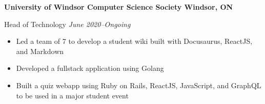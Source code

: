 \textbf{University of Windsor Computer Science Society \hfill Windsor, ON}

Head of Technology \hfill \textit{June 2020--Ongoing}
\begin{itemize}
    \item Led a team of 7 to develop a student wiki built with Docusaurus, ReactJS, and Markdown
    \item Developed a fullstack application using Golang
    \item Built a quiz webapp using Ruby on Rails, ReactJS, JavaScript, and GraphQL to be used in a major student event
\end{itemize}
